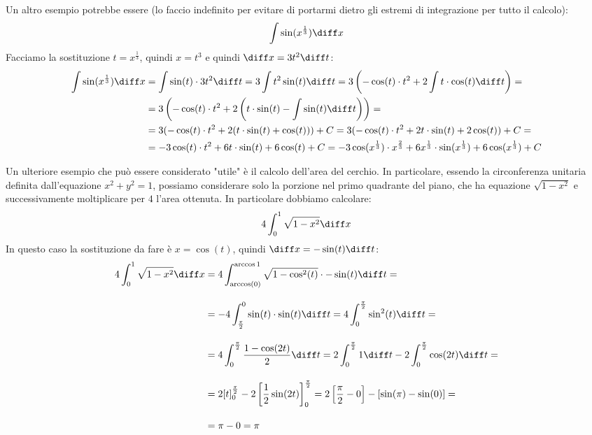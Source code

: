 Un altro esempio potrebbe essere (lo faccio indefinito per evitare di portarmi dietro gli estremi di integrazione per tutto il calcolo):
\begin{align*}
	\int \sin(x^{\frac{1}{3}}) \diff x
\end{align*}
Facciamo la sostituzione $t = x^{\frac{1}{3}}$, quindi $x = t^3$ e quindi $\diff x = 3 t^2 \diff t$:
\begin{align*}
	\int \sin(x^{\frac{1}{3}}) \diff x &= \int \sin(t) \cdot 3t^2 \diff t = 3 \int t^2 \sin(t) \diff t = 3 \left(-\cos(t) \cdot t^2 + 2\int t \cdot \cos(t) \diff t \right) =\\
	&= 3 \left(-\cos(t) \cdot t^2 + 2\left(t \cdot \sin(t) - \int \sin(t) \diff t \right)\right) =\\
	&= 3 (-\cos(t) \cdot t^2 + 2(t \cdot \sin(t) + \cos (t) )) + C = 3 (-\cos(t) \cdot t^2 + 2t \cdot \sin(t) + 2\cos (t) ) + C=\\
	&= -3\cos(t) \cdot t^2 + 6t \cdot \sin(t) + 6\cos (t) + C =  -3\cos(x^{\frac{1}{3}}) \cdot x^{\frac{2}{3}} + 6x^{\frac{1}{3}} \cdot \sin(x^\frac{1}{3}) + 6\cos (x^\frac{1}{3}) + C
\end{align*}

Un ulteriore esempio che può essere considerato "utile" è il calcolo dell'area del cerchio. In particolare, essendo la circonferenza unitaria definita dall'equazione $x^2 + y^2 = 1$, possiamo considerare solo la porzione nel primo quadrante del piano, che ha equazione $\sqrt{1-x^2}$ e successivamente moltiplicare per $4$ l'area ottenuta. In particolare dobbiamo calcolare:
\begin{equation*}
	4 \int_0^1 \sqrt{1-x^2} \diff x
\end{equation*}
In questo caso la sostituzione da fare è $x = \cos(t)$, quindi $\diff x = -\sin(t) \diff t$:
\begin{align*}
	4 \int_0^1 \sqrt{1-x^2} \diff x &= 4 \int_{\arccos(0)}^{\arccos{1}} \sqrt{1-\cos^2(t)} \cdot - \sin(t) \diff t = \\[10pt]
	&= -4 \int_{\frac{\pi}{2}}^0 \sin(t) \cdot \sin(t) \diff t = 4 \int_0^{\frac{\pi}{2}} \sin^2(t)\diff t = \\[10pt]
	&= 4 \int_0^{\frac{\pi}{2}} \dfrac{1 - \cos(2t)}{2}\diff t = 2 \int_0^{\frac{\pi}{2}} 1 \diff t - 2 \int_0^{\frac{\pi}{2}} \cos(2t) \diff t = \\[10pt]
	&= 2[t]_0^{\frac{\pi}{2}} - 2\left[\dfrac{1}{2} \sin(2t) \right]_0^{\frac{\pi}{2}} = 2 \left[\dfrac{\pi}{2} - 0\right] - [\sin(\pi) - \sin(0)] = \\[10pt]
	&= \pi - 0 = \pi
\end{align*}


